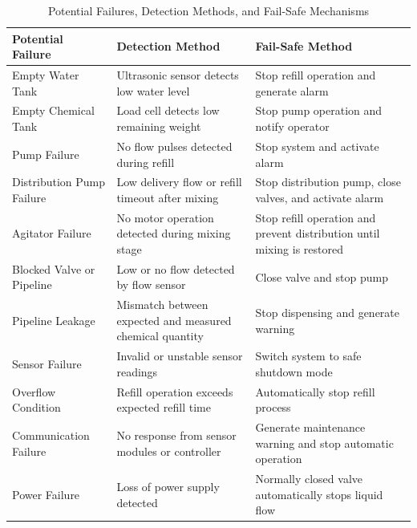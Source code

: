 \documentclass[12pt,a4paper]{report}
\begin{document}
\begin{table}[H]
\centering
\small
\setlength{\tabcolsep}{4pt}
\renewcommand{\arraystretch}{1.15}
\begin{tabularx}{\textwidth}{|p{3.5cm}|>{\raggedright\arraybackslash}X|>{\raggedright\arraybackslash}X|}
\hline
\textbf{Potential Failure} & \textbf{Detection Method} & \textbf{Fail-Safe Method} \\
\hline

Empty Water Tank &
Ultrasonic sensor detects low water level &
Stop refill operation and generate alarm \\
\hline

Empty Chemical Tank &
Load cell detects low remaining weight &
Stop pump operation and notify operator \\
\hline

Pump Failure &
No flow pulses detected during refill &
Stop system and activate alarm \\
\hline

Distribution Pump Failure &
Low delivery flow or refill timeout after mixing &
Stop distribution pump, close valves, and activate alarm \\
\hline

Agitator Failure &
No motor operation detected during mixing stage &
Stop refill operation and prevent distribution until mixing is restored \\
\hline

Blocked Valve or Pipeline &
Low or no flow detected by flow sensor &
Close valve and stop pump \\
\hline

Pipeline Leakage &
Mismatch between expected and measured chemical quantity &
Stop dispensing and generate warning \\
\hline

Sensor Failure &
Invalid or unstable sensor readings &
Switch system to safe shutdown mode \\
\hline

Overflow Condition &
Refill operation exceeds expected refill time &
Automatically stop refill process \\
\hline

Communication Failure &
No response from sensor modules or controller &
Generate maintenance warning and stop automatic operation \\
\hline

Power Failure &
Loss of power supply detected &
Normally closed valve automatically stops liquid flow \\
\hline

\end{tabularx}
\caption{Potential Failures, Detection Methods, and Fail-Safe Mechanisms}
\end{table}
\end{document}
